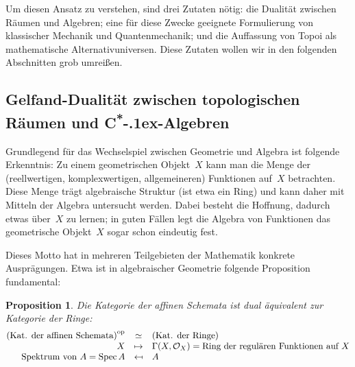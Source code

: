 \documentclass[a4paper,ngerman,12pt]{scrartcl}
\theoremstyle{definition}
\theoremstyle{plain}
\newtheorem{prop}[defn]{Proposition}
\theoremstyle{remark}
\renewcommand{\O}{\mathcal{O}}
\newcommand{\csalgebren}{C\textsuperscript{*}\kern-.1ex-Alge\-bren}
\DeclareMathOperator{\Spec}{Spec}
\newcommand{\op}{\mathrm{op}}
\renewcommand{\_}{\mathpunct{.}\,}
\newcommand{\?}{\,{:}\,}
\begin{document}
Um diesen Ansatz zu verstehen, sind drei Zutaten nötig: die Dualität zwischen
Räumen und Algebren; eine für diese Zwecke geeignete Formulierung von
klassischer Mechanik und Quantenmechanik; und die Auffassung von Topoi als
mathematische Alternativuniversen. Diese Zutaten wollen wir in den folgenden
Abschnitten grob umreißen.


\subsection{Gelfand-Dualität zwischen topologischen Räumen und \csalgebren}

Grundlegend für das Wechselspiel zwischen Geometrie und Algebra ist folgende
Erkenntnis: Zu einem geometrischen Objekt~$X$ kann man die Menge der
(reellwertigen, komplexwertigen, allgemeineren) Funktionen auf~$X$ betrachten.
Diese Menge trägt algebraische Struktur (ist etwa ein Ring) und kann daher mit
Mitteln der Algebra untersucht werden. Dabei besteht die Hoffnung, dadurch
etwas über~$X$ zu lernen; in guten Fällen legt die Algebra von Funktionen
das geometrische Objekt~$X$ sogar schon eindeutig fest.

Dieses Motto hat in mehreren Teilgebieten der Mathematik konkrete Ausprägungen.
Etwa ist in algebraischer Geometrie folgende Proposition fundamental:
\begin{prop}Die Kategorie der affinen Schemata ist dual äquivalent zur Kategorie der
Ringe:
\[ \begin{array}{@{}rcl@{}}
  \textnormal{(Kat. der affinen Schemata)}^\op &\simeq& \textnormal{(Kat. der Ringe)} \\
  X &\mapsto& \Gamma(X, \O_X) = \textnormal{Ring der regulären Funktionen auf~$X$} \\
  \textnormal{Spektrum von~$A$} = \Spec A &\mapsfrom& A
\end{array} \]
\end{prop}
\end{document}
